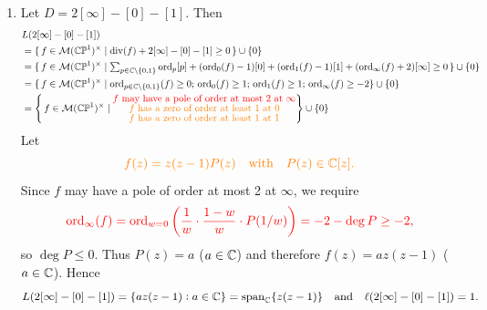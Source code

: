 \documentclass[11pt,openany]{article}
\newcommand{\ord}{\operatorname{ord}}
\begin{document}
\begin{example}
\begin{enumerate}[(1)]
\[	f(z)=(z-1)(az+b)=az^2+(-a+b)z+b,\quad a,b\in\C.
	\] Then \[
	L(2[\infty]-[1])\subseteq\operatorname{span}_\C\{1,z,z^2\}\quad\text{but}\quad L(2[\infty]-1)\neq\operatorname{span}_\C\{1,z,z^2\}.
	\] since $L(2[\infty]-[1])$ has the condition that the function must must be vanish at $z=1$. Thus, \[
	f(z)=(z-1)(az+b)=az(z-1)+b(z-1),\quad a,b\in\C.
	\]
	Hence \[
	L(2[\infty]-[1])=\set{az(z-1)+b(z-1):a,b\in\C}=\operatorname{span}_\C\left\{z-1,z(z-1)\right\}
	\quad\text{and}\quad
	\ell(2[\infty]-[1])=2.
	\] 
	\newpage
	\item {\color{blue} Let $D=2[\infty]-[0]-[1]$.} Then
	\begin{align*}
		&L(2[\infty]-[0]-[1])\\
		&=\{\,f\in\mathcal M(\mathbb{CP}^1)^\times\mid \operatorname{div}(f)+2[\infty]-[0]-[1]\ge 0\,\}\cup\{0\}\\
		&=\{\,f\in\mathcal M(\mathbb{CP}^1)^\times\mid \textstyle\sum_{p\in\C\setminus\{0,1\}}\ord_p[p]+(\ord_0(f)-1)[0]+(\ord_1(f)-1)[1]+(\ord_\infty(f)+2)[\infty]\ge 0\,\}\cup\{0\}\\
		&=\{\,f\in\mathcal M(\mathbb{CP}^1)^\times\mid \ord_{p\in\C\setminus\{0,1\}}(f)\geq 0;\,\ord_0(f)\geq 1;\,\ord_1(f)\geq 1; \,\ord_{\infty}(f)\geq -2\}\cup\{0\} \\
		&=\set{\,f\in\mathcal M(\mathbb{CP}^1)^\times\mid \substack{\text{\normalsize\color{red} $f$ may have a pole of order at most $2$ at $\infty$}\\ \text{\normalsize\color{orange} $f$ has a zero of order at least $1$ at $0$}\\ \text{\normalsize\color{orange} $f$ has a zero of order at least $1$ at $1$}}}\cup\{0\}
	\end{align*}
	Let \[
	\color{orange} f(z)=z(z-1)P(z)\quad\text{with}\quad P(z)\in\mathbb{C}[z].
	\]
	Since $f$ may have a pole of order at most 2 at $\infty$, we require \[
	\color{red}\ord_{\infty}(f)=\ord_{w=0}\left(\frac{1}{w}\cdot\frac{1-w}{w}\cdot P(1/w)\right)=-2-\deg P\ge -2,
	\] so $\deg P\leq 0$. Thus $P(z)=a$ ($a\in\mathbb{C}$)
	and therefore $f(z)=az(z-1)$ ($a\in\mathbb{C}$). Hence \[
	L(2[\infty]-[0]-[1])
	=\{az(z-1):a\in\mathbb{C}\}=
	\operatorname{span}_{\mathbb{C}}\{z(z-1)\}
	\quad\text{and}\quad
	\ell(2[\infty]-[0]-[1])=1.
	\]
	

\end{enumerate}
\end{example}
\end{document}
